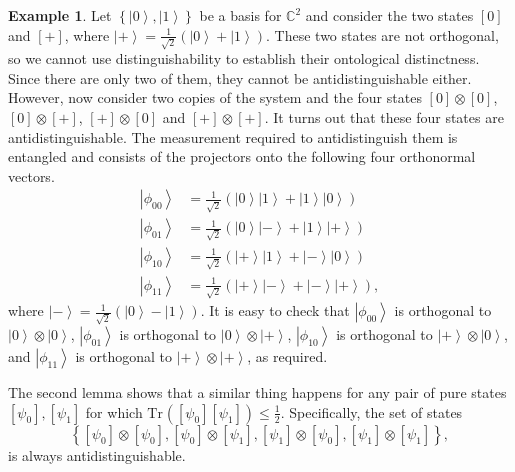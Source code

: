 \documentclass[DIV=calc,fontsize=12pt]{scrartcl} %
\theoremstyle{definition}
\newtheorem{example}[definition]{Example}
\theoremstyle{plain}
\newcommand{\Ket}[1]{\ensuremath{\left \vert #1 \right \rangle}}
\newcommand{\Proj}[1]{\ensuremath{\left [ #1 \right ]}}
\newcommand{\Tr}[2][]{\ensuremath{\text{Tr}_{#1} \left ( #2 \right )}}
\begin{document}
\begin{example}
\label{exa:Main:Pusey--Barrett--Rudolph}
Let $\left \{ \Ket{0}, \Ket{1} \right \}$ be a basis for
$\mathbb{C}^2$ and consider the two states $\Proj{0}$ and
$\Proj{+}$, where $\Ket{+} = \frac{1}{\sqrt{2}} \left ( \Ket{0} +
\Ket{1} \right )$.  These two states are not orthogonal, so we
cannot use distinguishability to establish their ontological
distinctness.  Since there are only two of them, they cannot be
antidistinguishable either.  However, now consider two copies of the
system and the four states $\Proj{0}\otimes \Proj{0}$, $\Proj{0}
\otimes \Proj{+}$, $\Proj{+} \otimes \Proj{0}$ and $\Proj{+} \otimes
\Proj{+}$.  It turns out that these four states are
antidistinguishable.  The measurement required to antidistinguish
them is entangled and consists of the projectors onto the following
four orthonormal vectors.
\begin{align}
\Ket{\phi_{00}} & = \frac{1}{\sqrt{2}} \left ( \Ket{0}
\Ket{1} + \Ket{1} \Ket{0} \right) \\
\Ket{\phi_{01}} & = \frac{1}{\sqrt{2}} \left ( \Ket{0}
\Ket{-} + \Ket{1} \Ket{+} \right) \\
\Ket{\phi_{10}} & = \frac{1}{\sqrt{2}} \left ( \Ket{+}
\Ket{1} + \Ket{-} \Ket{0} \right) \\
\Ket{\phi_{11}} & = \frac{1}{\sqrt{2}} \left ( \Ket{+}
\Ket{-} + \Ket{-} \Ket{+} \right),
\end{align}
where $\Ket{-} = \frac{1}{\sqrt{2}} \left ( \Ket{0} - \Ket{1}
\right )$.  It is easy to check that $\Ket{\phi_{00}}$ is orthogonal to
$\Ket{0}\otimes \Ket{0}$, $\Ket{\phi_{01}}$ is orthogonal to
$\Ket{0} \otimes \Ket{+}$, $\Ket{\phi_{10}}$ is orthogonal to
$\Ket{+} \otimes \Ket{0}$, and $\Ket{\phi_{11}}$ is orthogonal to
$\Ket{+} \otimes \Ket{+}$, as required.

The second lemma shows that a similar thing happens for any pair of
pure states $\Proj{\psi_0}, \Proj{\psi_1}$ for which
$\Tr{\Proj{\psi_0}\Proj{\psi_1}} \leq \frac{1}{2}$.  Specifically,
the set of states
\begin{equation}
\left \{ \Proj{\psi_{0}} \otimes \Proj{\psi_{0}}, \Proj{\psi_{0}}
\otimes \Proj{\psi_{1}}, \Proj{\psi_{1}} \otimes
\Proj{\psi_{0}}, \Proj{\psi_{1}} \otimes \Proj{\psi_{1}} \right
\},
\end{equation}
is always antidistinguishable.


\end{example}
\end{document}
